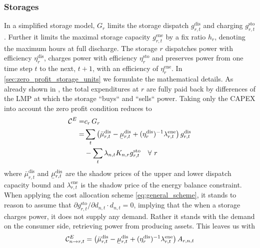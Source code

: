 \documentclass[11pt,twocolumn]{article}
\newcommand{\ubar}[1]{\underaccent{\bar}{#1}}
\newcommand{\Forall}[1]{\hspace{10pt} \forall \,\, #1 }
\newcommand{\storage}{g_{r,t}}
\newcommand{\storagedispatch}{\storage^\text{dis}}
\newcommand{\storagecharge}{\storage^\text{sto}}
\newcommand{\storagesoc}{\storage^\text{ene}}
\newcommand{\efficiency}{\eta_{r}}
\newcommand{\efficiencydispatch}{\efficiency^\text{dis}}
\newcommand{\efficiencycharge}{\efficiency^\text{sto}}
\newcommand{\efficiencysoc}{\efficiency^\text{ene}}
\newcommand{\capitalpricestorage}{c_r}
\newcommand{\capacitystorage}{G_r}
\newcommand{\mulowerstoragedispatch}{\ubar{\mu}_{r,t}^\text{dis}}
\newcommand{\muupperstoragedispatch}{\bar{\mu}_{r,t}^\text{dis}}
\newcommand{\muupperstoragecharge}{\bar{\mu}_{r,t}^\text{sto}}
\newcommand{\muupperstoragesoc}{\bar{\mu}_{r,t}^\text{ene}}
\newcommand{\mustateofcharge}{\lambda^\text{ene}_{r,t}}
\newcommand{\lmp}[1][n]{\lambda_{#1,t}}
\newcommand{\demand}[1][n]{d_{#1,t}}
\newcommand{\incidencestorage}[1][n]{K_{#1,r}}
\newcommand{\allocatestoragedispatch}[1][r, n]{A_{#1,t}}
\newcommand{\allocatecapexstorage}[1][n \rightarrow r]{\mathcal{C}^{E}_{#1,t}}
\newcommand{\capexstorage}{\mathcal{C}^E}
\begin{document}
\subsubsection{Storages}


In a simplified storage model, $\capacitystorage$ limits the storage dispatch $\storagedispatch$ and charging $\storagecharge$. Further it limits the maximal storage capacity $\storagesoc$ by a fix ratio $h_r$, denoting the maximum hours at full discharge. The storage $r$ dispatches power with efficiency $\efficiencydispatch$, charges power with efficiency $\efficiencycharge$ and preserves power from one time step $t$ to the next, $t+1$, with an efficiency of $\efficiencysoc$. In \cref{sec:zero_profit_storage_units} we formulate the mathematical details. As already shown in \cite{brown_decreasing_2020}, the total expenditures at $r$ are fully paid back by differences of the LMP at which the storage ``buys`` and ``sells`` power. Taking only the CAPEX into account the zero profit condition reduces to
\begin{align}
    \notag
    \capexstorage =& \capitalpricestorage \, \capacitystorage \\
    \notag
    =& \sum_t \left(\muupperstoragedispatch - \mulowerstoragedispatch  + (\efficiencydispatch )^{-1} \mustateofcharge \right) \storagedispatch \\
    &- \sum_t \lmp \incidencestorage  \storagecharge \Forall{r} 
    \label{eq:no_profit_capex_storage}
\end{align}
where $\muupperstoragedispatch$ and $\mulowerstoragedispatch$ are the shadow prices of the upper and lower dispatch capacity bound and $\mustateofcharge$ is the shadow price of the energy balance constraint. When applying the cost allocation scheme \cref{eq:general_scheme}, it stands to reason to assume that $\partial \storagecharge / \partial \demand \cdot \demand = 0$, implying that the when a storage charges power, it does not supply any demand. Rather it stands with the demand on the consumer side, retrieving power from producing assets. 
This leaves us with 
\begin{align}
     \allocatecapexstorage = \left(\muupperstoragedispatch - \mulowerstoragedispatch  + (\efficiencydispatch )^{-1} \mustateofcharge \right) \allocatestoragedispatch
\end{align}
\end{document}
